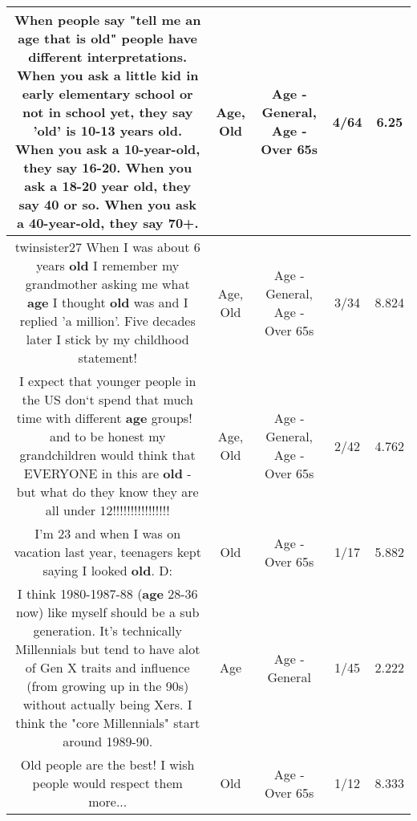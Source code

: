\documentclass[11pt]{article}
\newlength\mylength
\begin{document}
\begin{center}
\begin{longtable}{|C{.65\mylength}|C{.30\mylength}|C{.12\mylength}|C{.12\mylength}|C{.12\mylength}|}
  \small When people say "tell me an \textbf{age} that is \textbf{old}" people have different interpretations. When you ask a little kid in early elementary school or not in school yet, they say '\textbf{old}' is 10-13 years \textbf{old}. When you ask a 10-year-\textbf{old}, they say 16-20. When you ask a 18-20 year \textbf{old}, they say 40 or so. When you ask a 40-year-\textbf{old}, they say 70+.\normalsize   & Age, Old & Age - General, Age - Over 65s & 4/64 & 6.25 \\  \hline
  \small twinsister27 When I was about  6 years \textbf{old} I remember my grandmother asking me what \textbf{age} I thought \textbf{old} was and I replied 'a million'. Five decades later I stick by my childhood statement!\normalsize   & Age, Old & Age - General, Age - Over 65s & 3/34 & 8.824 \\  \hline
  \small I expect that younger people in the US don`t spend that much time with different \textbf{age} groups!  and to be honest my grandchildren would think that EVERYONE in this are \textbf{old} - but what do they know they are all under 12!!!!!!!!!!!!!!!!\normalsize   & Age, Old & Age - General, Age - Over 65s & 2/42 & 4.762 \\  \hline
  \small I'm 23 and when I was on vacation last year, teenagers kept saying I looked \textbf{old}. D:\normalsize   & Old & Age - Over 65s & 1/17 & 5.882 \\  \hline
  \small I think 1980-1987-88 (\textbf{age} 28-36 now) like myself should be a sub generation. It's technically Millennials but tend to have alot of Gen X traits and influence (from growing up in the 90s) without actually being Xers. I think the "core Millennials" start around 1989-90.\normalsize   & Age & Age - General & 1/45 & 2.222 \\  \hline
  \small Old people are the best! I wish people would respect them more...\normalsize   & Old & Age - Over 65s & 1/12 & 8.333 \\  \hline

\end{longtable}
\end{center}
\end{document}

